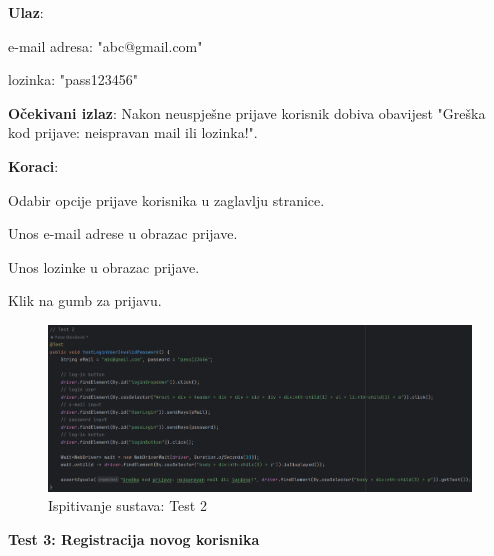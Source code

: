 		 	\begin{packed_item} 
		 		\item \textbf{Ulaz}:
		 		\begin{packed_item} 
		 			\item e-mail adresa: "abc@gmail.com"
		 			\item lozinka: "pass123456"
		 		\end{packed_item}
		 		\item \textbf{Očekivani izlaz}: Nakon neuspješne prijave korisnik dobiva obavijest "Greška kod prijave: neispravan mail ili lozinka!".
		 		\item \textbf{Koraci}:
		 		\begin{packed_enum} 
		 			\item Odabir opcije prijave korisnika u zaglavlju stranice.
		 			\item Unos e-mail adrese u obrazac prijave.
		 			\item Unos lozinke u obrazac prijave.
		 			\item Klik na gumb za prijavu.
		 		\end{packed_enum}
		 	\end{packed_item}
		 	
		 	\begin{figure}[H]
		 		\includegraphics[width=\textwidth]{slike/SeleniumTest2.png} %
		 		\caption{Ispitivanje sustava: Test 2}
		 		\label{fig:SeleniumTest2} %
		 	\end{figure}
		 	
		 	\textbf{Test 3: Registracija novog korisnika}
		 	
